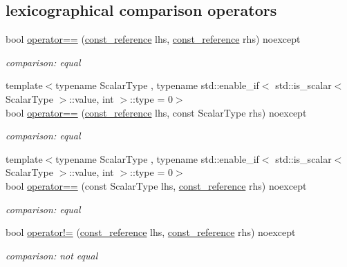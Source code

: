 \subsection*{lexicographical comparison operators}
\begin{DoxyCompactItemize}
\item 
bool \hyperlink{classnlohmann_1_1basic__json_a122640e7e2db1814fc7bbb3c122ec76e}{operator==} (\hyperlink{classnlohmann_1_1basic__json_a4057c5425f4faacfe39a8046871786ca}{const\+\_\+reference} lhs, \hyperlink{classnlohmann_1_1basic__json_a4057c5425f4faacfe39a8046871786ca}{const\+\_\+reference} rhs) noexcept
\begin{DoxyCompactList}\small\item\em comparison\+: equal \end{DoxyCompactList}\item 
{\footnotesize template$<$typename Scalar\+Type , typename std\+::enable\+\_\+if$<$ std\+::is\+\_\+scalar$<$ Scalar\+Type $>$\+::value, int $>$\+::type  = 0$>$ }\\bool \hyperlink{classnlohmann_1_1basic__json_aba21440ea1aff44f718285ed7d6d20d9}{operator==} (\hyperlink{classnlohmann_1_1basic__json_a4057c5425f4faacfe39a8046871786ca}{const\+\_\+reference} lhs, const Scalar\+Type rhs) noexcept
\begin{DoxyCompactList}\small\item\em comparison\+: equal \end{DoxyCompactList}\item 
{\footnotesize template$<$typename Scalar\+Type , typename std\+::enable\+\_\+if$<$ std\+::is\+\_\+scalar$<$ Scalar\+Type $>$\+::value, int $>$\+::type  = 0$>$ }\\bool \hyperlink{classnlohmann_1_1basic__json_aef302e3ae215e46e5035d0e4fdf47235}{operator==} (const Scalar\+Type lhs, \hyperlink{classnlohmann_1_1basic__json_a4057c5425f4faacfe39a8046871786ca}{const\+\_\+reference} rhs) noexcept
\begin{DoxyCompactList}\small\item\em comparison\+: equal \end{DoxyCompactList}\item 
bool \hyperlink{classnlohmann_1_1basic__json_a6e2e21da48f5d9471716cd868a068327}{operator!=} (\hyperlink{classnlohmann_1_1basic__json_a4057c5425f4faacfe39a8046871786ca}{const\+\_\+reference} lhs, \hyperlink{classnlohmann_1_1basic__json_a4057c5425f4faacfe39a8046871786ca}{const\+\_\+reference} rhs) noexcept
\begin{DoxyCompactList}\small\item\em comparison\+: not equal \end{DoxyCompactList}\item 

\end{DoxyCompactItemize}
